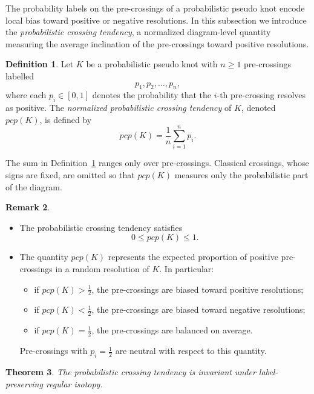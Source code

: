 \documentclass[a4paper, reqno, 12pt]{amsart}
\theoremstyle{plain}
\newtheorem{theorem}{Theorem}[section]
\theoremstyle{definition}
\newtheorem{definition}[theorem]{Definition}
\newtheorem{remark}[theorem]{Remark}
\begin{document}
The probability labels on the pre-crossings of a probabilistic pseudo knot encode local bias toward positive or negative resolutions. In this subsection we introduce the \emph{probabilistic crossing tendency}, a normalized diagram-level quantity measuring the average inclination of the pre-crossings toward positive resolutions.

\begin{definition}\label{tend}\rm
Let \(K\) be a probabilistic pseudo knot with \(n\geq 1\) pre-crossings labelled
\[
p_1,p_2,\ldots,p_n,
\]
where each \(p_i\in[0,1]\) denotes the probability that the \(i\)-th pre-crossing resolves as positive. The \emph{normalized probabilistic crossing tendency} of \(K\), denoted \(pcp(K)\), is defined by
\[
pcp(K)=\frac{1}{n}\sum_{i=1}^{n}p_i.
\]
\end{definition}

The sum in Definition~\ref{tend} ranges only over pre-crossings. Classical crossings, whose signs are fixed, are omitted so that \(pcp(K)\) measures only the probabilistic part of the diagram.

\begin{remark}\rm
\begin{itemize}
\item[(i)] The probabilistic crossing tendency satisfies
\[
0\le pcp(K)\le 1.
\]

\item[(ii)] The quantity \(pcp(K)\) represents the expected proportion of positive pre-crossings in a random resolution of \(K\). In particular:
\begin{itemize}
\item if \(pcp(K)>\frac12\), the pre-crossings are biased toward positive resolutions;

\item if \(pcp(K)<\frac12\), the pre-crossings are biased toward negative resolutions;

\item if \(pcp(K)=\frac12\), the pre-crossings are balanced on average.
\end{itemize}

Pre-crossings with \(p_i=\frac12\) are neutral with respect to this quantity.
\end{itemize}
\end{remark}

\begin{theorem}
The probabilistic crossing tendency is invariant under label-preserving regular isotopy.
\end{theorem}
\end{document}
